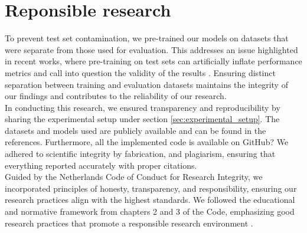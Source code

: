 \section{Reponsible research} %
\label{sec:responsible_research}
To prevent test set contamination, we pre-trained our models on datasets that were separate from those used for evaluation. This addresses an issue highlighted in recent works, where pre-training on test sets can artificially inflate performance metrics and call into question the validity of the results \cite{schaeffer2023pretraining}. Ensuring distinct separation between training and evaluation datasets maintains the integrity of our findings and contributes to the reliability of our research.
\\
In conducting this research, we ensured transparency and reproducibility by sharing the experimental setup under section \ref{sec:experimental_setup}. The datasets and models used are publicly available and can be found in the references. Furthermore, all the implemented code is available on GitHub? We adhered to scientific integrity by fabrication, and plagiarism, ensuring that everything reported accurately with proper citations.
\\
Guided by the Netherlands Code of Conduct for Research Integrity, we incorporated principles of honesty, transparency, and responsibility, ensuring our research practices align with the highest standards. We followed the educational and normative framework from chapters 2 and 3 of the Code, emphasizing good research practices that promote a responsible research environment \cite{knaw2018integrity}. 